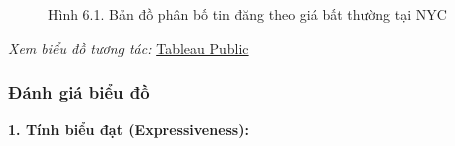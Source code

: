\begin{figure}[H]
    \centering
    \caption{Hình 6.1. Bản đồ phân bố tin đăng theo giá bất thường tại NYC}
    \label{fig:domain-task6-chart1}
\end{figure}

\noindent\small\textit{Xem biểu đồ tương tác: }\href{https://public.tableau.com/app/profile/duy.le4605/viz/Group10_17788537028430/Task6_1-PriceOutlierMap?publish=yes}{Tableau Public}\normalsize

\subsubsection{Đánh giá biểu đồ}

\textbf{1. Tính biểu đạt (Expressiveness):}

